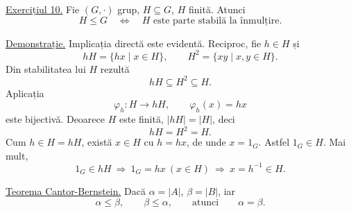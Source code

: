 \medskip
\noindent\underline{Exercițiul 10.}
Fie $(G,\cdot)$ grup, $H\subseteq G$, $H$ finită. Atunci
\[
 H\leq G\quad\Longleftrightarrow\quad
 H\text{ este parte stabilă la înmulțire}.
\]

\noindent\underline{Demonstrație.}
Implicația directă este evidentă. Reciproc, fie $h\in H$ și
\[
 hH=\{hx\mid x\in H\},\qquad
 H^2=\{xy\mid x,y\in H\}.
\]
Din stabilitatea lui $H$ rezultă
\[
 hH\subseteq H^2\subseteq H.
\]
Aplicația
\[
 \varphi_h:H\longrightarrow hH,\qquad
 \varphi_h(x)=hx
\]
este bijectivă. Deoarece $H$ este finită, $|hH|=|H|$, deci
\[
 hH=H^2=H.
\]
Cum $h\in H=hH$, există $x\in H$ cu $h=hx$, de unde
$x=1_G$. Astfel $1_G\in H$. Mai mult,
\[
 1_G\in hH\ \Longrightarrow\
  1_G=hx\ (x\in H)\ \Longrightarrow\
  x=h^{-1}\in H.
\]

\medskip
\noindent\underline{Teorema Cantor-Bernstein.}
Dacă $\alpha=|A|$, $\beta=|B|$, iar
\[
 \alpha\leq\beta,\qquad\beta\leq\alpha,
 \qquad\text{atunci}\qquad \alpha=\beta.
\]
